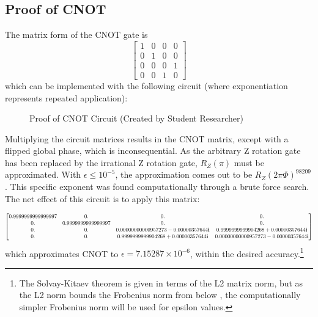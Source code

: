 \documentclass[12pt]{article}
\begin{document}
\subsection{Proof of CNOT}
The matrix form of the CNOT gate is
$$
\begin{bmatrix}
    1&0&0&0\\
    0&1&0&0\\
    0&0&0&1\\
    0&0&1&0
\end{bmatrix}
$$
which can be implemented with the following circuit (where exponentiation represents repeated application):
\begin{figure}[h]
    \centering
    \caption{Proof of CNOT Circuit (Created by Student Researcher)}
    \label{fig:quantum universal set 1 proof of CNOT circuit algebraic}
\end{figure}

Multiplying the circuit matrices results in the CNOT matrix, except with a flipped global phase, which is inconsequential. As the arbitrary Z rotation gate has been replaced by the irrational Z rotation gate, $R_Z(\pi)$ must be approximated. With $\epsilon \le 10^{-5}$, the approximation comes out to be $R_Z(2\pi \Phi)^{98209}$. This specific exponent was found computationally through a brute force search. The net effect of this circuit is to apply this matrix:

$$
\scalebox{0.7}{$
\begin{bmatrix}
    0.9999999999999997&0.&0.&0.\\
    0.&0.9999999999999997&0.&0.\\
    0.&0.&0.00000000000957273-0.00000357644\mathbf{i}&0.9999999999904268+0.00000357644 \mathbf{i}\\
    0.&0.&0.9999999999904268 + 0.00000357644 \mathbf{i}&0.00000000000957273-0.00000357644\mathbf{i}
\end{bmatrix}
$}
$$
which approximates CNOT to $\epsilon = 7.15287 \times 10^{-6}$, within the desired accuracy.\footnote{The Solvay-Kitaev theorem \cite{Dawson2005solovaykitaevalgorithm} is given in terms of the L2 matrix norm, but as the L2 norm bounds the Frobenius norm from below \cite{GeijnMyers}, the computationally simpler Frobenius norm will be used for epsilon values.}
\end{document}
